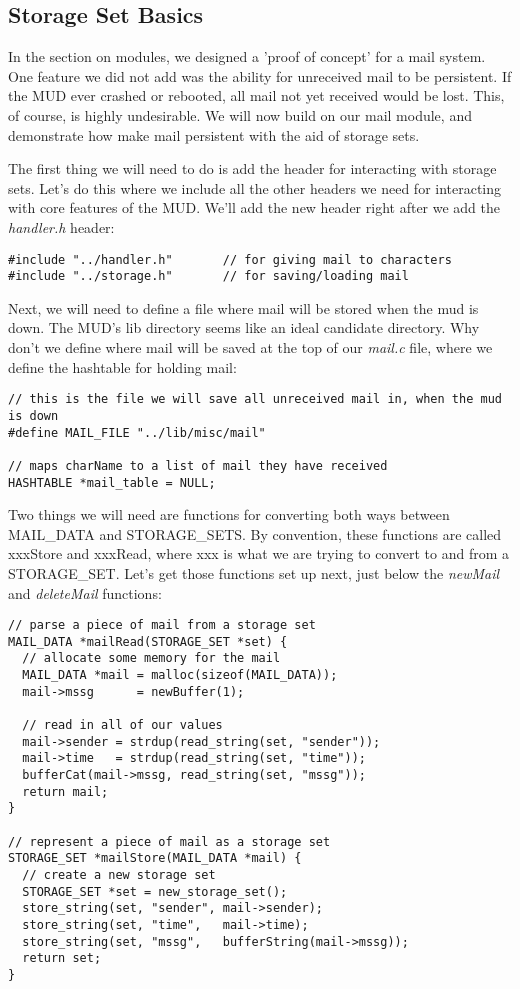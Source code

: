 \documentclass[12pt]{article}
\begin{document}
\subsection{Storage Set Basics}
In the section on modules, we designed a 'proof of concept' for a mail system. One feature we did not add was the ability for unreceived mail to be persistent. If the MUD ever crashed or rebooted, all mail not yet received would be lost. This, of course, is highly undesirable. We will now build on our mail module, and demonstrate how make mail persistent with the aid of storage sets.

The first thing we will need to do is add the header for interacting with storage sets. Let's do this where we include all the other headers we need for interacting with core features of the MUD. We'll add the new header right after we add the {\it handler.h} header:

{\bf \begin{verbatim}
#include "../handler.h"       // for giving mail to characters
#include "../storage.h"       // for saving/loading mail
\end{verbatim}}

Next, we will need to define a file where mail will be stored when the mud is down. The MUD's lib directory seems like an ideal candidate directory. Why don't we define where mail will be saved at the top of our {\it mail.c} file, where we define the hashtable for holding mail:

{\bf \begin{verbatim}
// this is the file we will save all unreceived mail in, when the mud is down
#define MAIL_FILE "../lib/misc/mail"

// maps charName to a list of mail they have received
HASHTABLE *mail_table = NULL;
\end{verbatim}}

Two things we will need are functions for converting both ways between MAIL\_DATA and STORAGE\_SETS. By convention, these functions are called xxxStore and xxxRead, where xxx is what we are trying to convert to and from a STORAGE\_SET. Let's get those functions set up next, just below the {\it newMail} and {\it deleteMail} functions:

{\bf \begin{verbatim}
// parse a piece of mail from a storage set
MAIL_DATA *mailRead(STORAGE_SET *set) {
  // allocate some memory for the mail
  MAIL_DATA *mail = malloc(sizeof(MAIL_DATA));
  mail->mssg      = newBuffer(1);

  // read in all of our values
  mail->sender = strdup(read_string(set, "sender"));
  mail->time   = strdup(read_string(set, "time"));
  bufferCat(mail->mssg, read_string(set, "mssg"));
  return mail;
}

// represent a piece of mail as a storage set
STORAGE_SET *mailStore(MAIL_DATA *mail) {
  // create a new storage set
  STORAGE_SET *set = new_storage_set();
  store_string(set, "sender", mail->sender);
  store_string(set, "time",   mail->time);
  store_string(set, "mssg",   bufferString(mail->mssg));
  return set;
}
\end{verbatim}}
\end{document}
